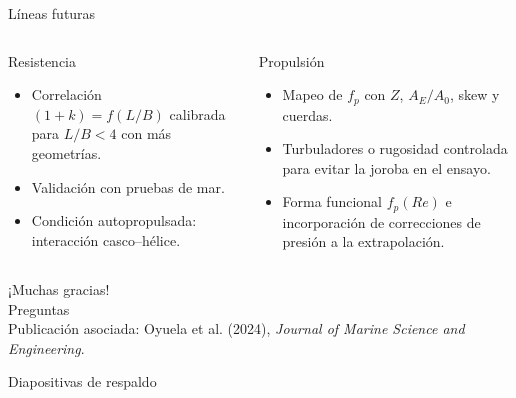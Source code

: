 \documentclass[aspectratio=169,10pt]{beamer}
\newcommand{\uk}{(1+k)}
\begin{document}
\begin{frame}{Líneas futuras}
\begin{columns}[T]
\begin{block}{Resistencia}
\small
\begin{itemize}
  \item Correlación $\uk = f(L/B)$ calibrada para $L/B<4$ con más geometrías.
  \item Validación con \alert{pruebas de mar}.
  \item Condición autopropulsada: interacción casco–hélice.
\end{itemize}
\end{block}
\begin{block}{Propulsión}
\small
\begin{itemize}
  \item Mapeo de $f_p$ con $Z$, $A_E/A_0$, skew y cuerdas.
  \item Turbuladores o rugosidad controlada para evitar la joroba en el ensayo.
  \item Forma funcional $f_p(Re)$ e incorporación de correcciones de presión a la extrapolación.
\end{itemize}
\end{block}
\end{columns}
\end{frame}

\begin{frame}[standout]
¡Muchas gracias!\\[1em]
{\normalsize Preguntas}\\[1.5em]
{\scriptsize\mdseries Publicación asociada: Oyuela et al. (2024), \textit{Journal of Marine Science and Engineering}.}
\end{frame}

\appendix
\begin{frame}[standout]
Diapositivas de respaldo
\end{frame}
\end{document}
